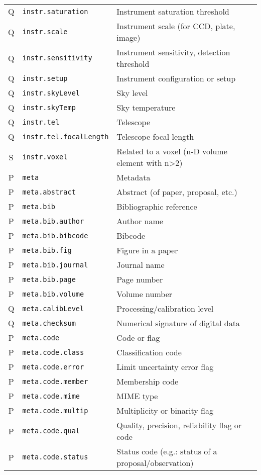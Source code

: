 \documentclass[11pt,a4paper]{ivoa}
\begin{document}
\begin{longtable}[h!]{c|p{40ex}|p{}}
Q & {\tt instr.saturation} & Instrument saturation threshold\\
Q & {\tt instr.scale} & Instrument scale (for CCD, plate, image)\\
Q & {\tt instr.sensitivity} & Instrument sensitivity, detection threshold\\
Q & {\tt instr.setup} & Instrument configuration or setup\\
Q & {\tt instr.skyLevel} & Sky level\\
Q & {\tt instr.skyTemp} & Sky temperature\\
Q & {\tt instr.tel} & Telescope\\
Q & {\tt instr.tel.focalLength} & Telescope focal length\\
S & {\tt instr.voxel} & Related to a voxel (n-D volume element with n>2)\\
P & {\tt meta} & Metadata\\
P & {\tt meta.abstract} & Abstract (of paper, proposal, etc.)\\
P & {\tt meta.bib} & Bibliographic reference\\
P & {\tt meta.bib.author} & Author name\\
P & {\tt meta.bib.bibcode} & Bibcode\\
P & {\tt meta.bib.fig} & Figure in a paper\\
P & {\tt meta.bib.journal} & Journal name\\
P & {\tt meta.bib.page} & Page number\\
P & {\tt meta.bib.volume} & Volume number\\
Q & {\tt meta.calibLevel} & Processing/calibration level\\
Q & {\tt meta.checksum} & Numerical signature of digital data\\
P & {\tt meta.code} & Code or flag\\
P & {\tt meta.code.class} & Classification code\\
P & {\tt meta.code.error} & Limit uncertainty error flag\\
P & {\tt meta.code.member} & Membership code\\
P & {\tt meta.code.mime} & MIME type\\
P & {\tt meta.code.multip} & Multiplicity or binarity flag\\
P & {\tt meta.code.qual} & Quality, precision, reliability flag or code\\
P & {\tt meta.code.status} & Status code (e.g.: status of a proposal/observation)\\

\end{longtable}
\end{document}
